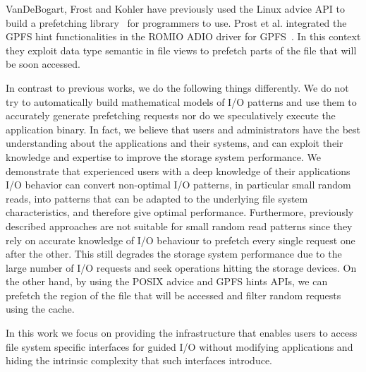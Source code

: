 VanDeBogart, Frost and Kohler have previously used the Linux advice API to build a prefetching library~\cite{VanDeBogartFK09} for programmers to use. Prost et al. integrated the GPFS hint functionalities in the ROMIO ADIO driver for GPFS~\cite{ProstTHJK01}. 
In this context they exploit data type semantic in file views to prefetch parts of the file that will be soon accessed. 

In contrast to previous works, we do the following things differently. We do not try to automatically build mathematical models of I/O patterns and use them to accurately generate prefetching requests nor do we speculatively execute the application binary. 
In fact, we believe that users and administrators have the best understanding about the applications and their systems, and can exploit their knowledge and expertise to improve the storage system performance. We demonstrate that experienced users with a deep 
knowledge of their applications I/O behavior can convert non-optimal I/O patterns, in particular small random reads, into patterns that can be adapted to the underlying file system characteristics, and therefore give optimal performance. %
Furthermore, previously described approaches are not suitable for small random read patterns since they rely on accurate knowledge of I/O behaviour %
to prefetch every single request one after the other. This still degrades the storage system performance due to the large number of I/O requests and seek operations hitting the storage devices. On the other hand, by using the POSIX advice and GPFS hints APIs, 
we can prefetch the region of the file that will be accessed and filter random requests using the cache. %

In this work we focus on providing the infrastructure that enables users to access file system specific interfaces for guided I/O without modifying applications and hiding the intrinsic complexity that such interfaces introduce. 
